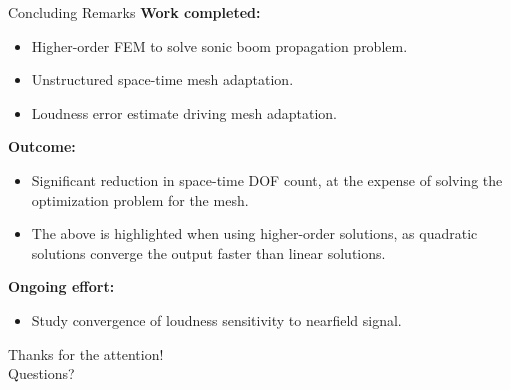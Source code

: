 \documentclass{beamer}
\begin{document}
{
\begin{frame}[t]{Concluding Remarks}
  \textbf{Work completed:}
  \begin{itemize}
    \item Higher-order FEM to solve sonic boom propagation problem.
    \item Unstructured space-time mesh adaptation.
    \item Loudness error estimate driving mesh adaptation.
  \end{itemize}

  {
  \textbf{Outcome:}
  \begin{itemize}
      \item Significant reduction in space-time DOF count, at the expense of solving the optimization problem for the mesh.
      \item The above is highlighted when using higher-order solutions, as quadratic solutions converge the output faster than linear solutions.
    \end{itemize}
  }

  {
    \vspace{15pt}
    \textbf{Ongoing effort:}
    \begin{itemize}
      \item Study convergence of loudness sensitivity to nearfield signal.
    \end{itemize}
  }
\end{frame}
}


\begin{frame}[plain]
  \vfill
  \centering
  {Thanks for the attention! \\ \small Questions?}
  \vfill
\end{frame}

\end{document}
